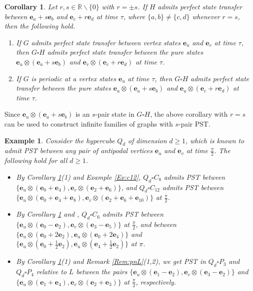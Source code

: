 \documentclass[11pt]{article}
\newtheorem{corollary}[theorem]{Corollary}
\newtheorem{example}[theorem]{Example}
\newcommand{\be}{\mathbf e}
\def\R{\mathbb{R}}
\begin{document}
\begin{corollary}
\label{Cor:cartconst}
Let $r,s\in\R\backslash\{0\}$ with $r=\pm s$.
If $H$ admits perfect state transfer between $\be_a+s\be_b$ and $\be_c+r\be_d$ at time $\tau$, where $\{a,b\}\neq \{c,d\}$ whenever $r=s$, then the following hold.
\begin{enumerate}
\item If $G$ admits perfect state transfer between vertex states $\be_u$ and $\be_v$ at time $\tau$, then $G\square H$ admits perfect state transfer between the pure states  $\be_u\otimes(\be_a+s\be_b)$ and $\be_v\otimes(\be_c+r\be_d)$ at time $\tau$.
\item If $G$ is periodic at a vertex states $\be_u$ at time $\tau$, then $G\square H$ admits perfect state transfer between the pure states  $\be_u\otimes(\be_a+s\be_b)$ and $\be_u\otimes(\be_c+r\be_d)$ at time $\tau$.
\end{enumerate}
\end{corollary}

Since $\be_u\otimes(\be_a+s\be_b)$ is an $s$-pair state in $G\square H$, the above corollary with $r=s$ can be used to construct infinite families of graphs with $s$-pair PST.

\begin{example}
Consider the hypercube $Q_d$ of dimension $d\ge 1$, which is known to admit PST between any pair of antipodal vertices $\be_u$ and $\be_{v}$ at time $\frac{\pi}{2}$. The following hold for all $d\geq 1$.
\begin{itemize}
\item By Corollary \ref{Cor:cartconst}(1) and Example \ref{Ex:c12}, $Q_d\square C_8$ admits PST between $\{\be_u\otimes(\be_0+\be_4),\be_v\otimes(\be_2+\be_6)\}$, and $Q_d\square C_{12}$ admits PST between $\{\be_u\otimes(\be_0+\be_4+\be_{8}),\be_v\otimes(\be_2+\be_6+\be_{10})\}$ at $\frac{\pi}{2}$.
\item By Corollary \ref{Cor:cartconst} and \cite[Theorem 6.5(iv-vi)]{kim2024generalization}, $Q_d\square C_6$ admits PST between $\{\be_u\otimes(\be_0-\be_2),\be_v\otimes(\be_3-\be_5)\}$ at $\frac{\pi}{2}$, and between $\{\be_u\otimes(\be_0+2\be_2),\be_u\otimes(\be_0+2\be_4)\}$ and $\{\be_u\otimes(\be_0+\frac{1}{2}\be_2),\be_u\otimes(\be_4+\frac{1}{2}\be_2)\}$ at $\pi$.
\item By Corollary \ref{Cor:cartconst}(1) and Remark \ref{Rem:pnL}(1,2), we get PST in $Q_d\square P_3$ and $Q_d\square P_4$  relative to $L$ between the pairs $\{\be_u\otimes(\be_1-\be_2),\be_v\otimes(\be_3-\be_2)\}$ and $\{\be_u\otimes(\be_1+\be_4),\be_v\otimes(\be_2+\be_3)\}$ at $\frac{\pi}{2}$, respectively.
\end{itemize}
\end{example}
\end{document}
